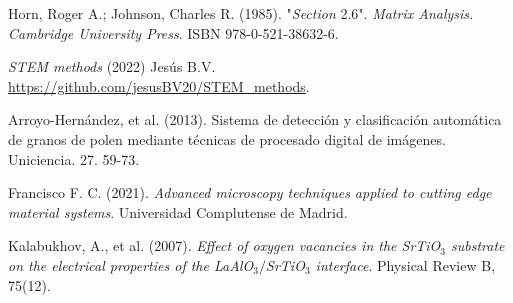\begin{thebibliography}{9}
Horn, Roger A.; Johnson, Charles R. (1985). "\textit{Section} 2.6". \textit{Matrix Analysis. Cambridge University Press}. ISBN 978-0-521-38632-6.

\textit{STEM methods} (2022) Jesús B.V. \url{https://github.com/jesusBV20/STEM_methods}.

Arroyo-Hernández, et al. (2013). Sistema de detección y clasificación automática de granos de polen mediante técnicas de procesado digital de imágenes. Uniciencia. 27. 59-73. 

Francisco F. C. (2021). \textit{Advanced microscopy techniques applied to cutting edge material systems}. Universidad Complutense de Madrid.

Kalabukhov, A., et al. (2007). \textit{Effect of oxygen vacancies in the SrTiO$_3$ substrate on the electrical properties of the LaAlO$_3/$SrTiO$_3$ interface}. Physical Review B, 75(12).

\end{thebibliography}


